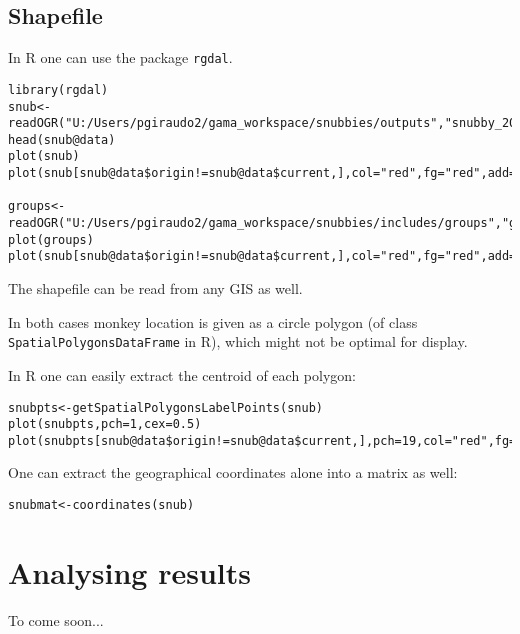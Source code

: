 \subsection{Shapefile}

In R one can use the package \texttt{rgdal}. 

\begin{lstlisting}
library(rgdal)
snub<-readOGR("U:/Users/pgiraudo2/gama_workspace/snubbies/outputs","snubby_2019_4392")
head(snub@data)
plot(snub)
plot(snub[snub@data$origin!=snub@data$current,],col="red",fg="red",add=TRUE)

groups<-readOGR("U:/Users/pgiraudo2/gama_workspace/snubbies/includes/groups","groups")
plot(groups)
plot(snub[snub@data$origin!=snub@data$current,],col="red",fg="red",add=TRUE)

\end{lstlisting}


The shapefile can be read from any GIS as well.  

In both cases monkey location is given as a circle polygon (of class \texttt{SpatialPolygonsDataFrame} in R), which might not be optimal for display.

In R one can easily extract the centroid of each polygon:

\begin{lstlisting}
snubpts<-getSpatialPolygonsLabelPoints(snub)
plot(snubpts,pch=1,cex=0.5)
plot(snubpts[snub@data$origin!=snub@data$current,],pch=19,col="red",fg="red",add=TRUE)
\end{lstlisting}

One can extract the geographical coordinates alone into a matrix as well:

\begin{lstlisting}
snubmat<-coordinates(snub)
\end{lstlisting}


\section{Analysing results}




To come soon...